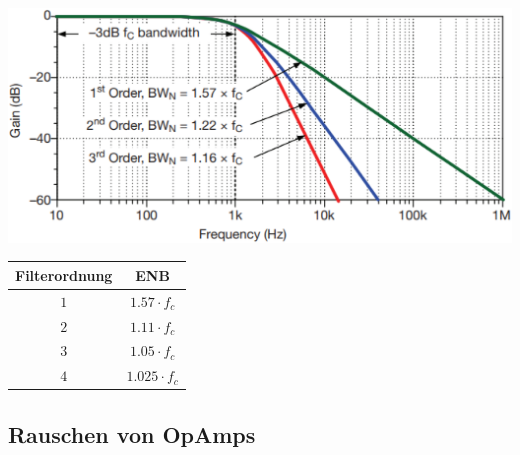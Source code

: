 \begin{minipage}[c]{0.6\columnwidth}
    \includegraphics[width=\columnwidth]{images/rausch_bandbreite.png}
\end{minipage}
\hfill
\begin{minipage}[c]{0.38\columnwidth}
    \begin{tabular}{c | c}
        \toprule
        \textbf{Filterordnung}  & \textbf{ENB} \\
        \midrule
        $1$                     & $1.57 \cdot f_c$ \\
        \midrule
        $2$                     & $1.11 \cdot f_c$ \\
        \midrule
        $3$                     & $1.05 \cdot f_c$ \\
        \midrule
        $4$                     & $1.025 \cdot f_c$ \\
        \bottomrule
    \end{tabular}

\end{minipage}


\subsection{Rauschen von OpAmps}
\label{Rauschen von OpAmps}

